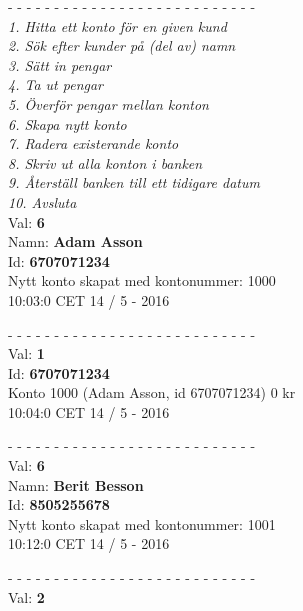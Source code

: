 \newenvironment{exampleblock}
	{\begin{minipage}{\columnwidth}
	 - - - - - - - - - - - - - - - - - - - - - - - - - - -\\}
	{\end{minipage}}

\begin{multicols}{2}
\noindent
\begin{exampleblock}
\textit{
1.   Hitta ett konto för en given kund\\
2.   Sök efter kunder på (del av) namn\\
3.   Sätt in pengar\\
4.   Ta ut pengar\\
5.   Överför pengar mellan konton\\
6.   Skapa nytt konto\\
7.   Radera existerande konto\\
8.   Skriv ut alla konton i banken\\
9.   Återställ banken till ett tidigare datum\\
10.  Avsluta\\
}
Val: \textbf{6}\\
Namn: \textbf{Adam Asson}\\
Id: \textbf{6707071234}\\
Nytt konto skapat med kontonummer: 1000\\
10:03:0 CET 14 / 5 - 2016\\
\end{exampleblock}
\begin{exampleblock}
Val: \textbf{1}\\
Id: \textbf{6707071234}\\
Konto 1000 (Adam Asson, id 6707071234) 0 kr\\
10:04:0 CET 14 / 5 - 2016\\
\end{exampleblock}
\begin{exampleblock}
Val: \textbf{6}\\
Namn: \textbf{Berit Besson}\\
Id: \textbf{8505255678}\\
Nytt konto skapat med kontonummer: 1001\\
10:12:0 CET 14 / 5 - 2016\\
\end{exampleblock}
\begin{exampleblock}
Val: \textbf{2}\\

\end{exampleblock}
\end{multicols}
